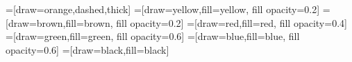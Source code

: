 =[draw=orange,dashed,thick]
=[draw=yellow,fill=yellow, fill opacity=0.2]
=[draw=brown,fill=brown, fill opacity=0.2]
=[draw=red,fill=red, fill opacity=0.4]
=[draw=green,fill=green, fill opacity=0.6]
=[draw=blue,fill=blue, fill opacity=0.6]
=[draw=black,fill=black]
